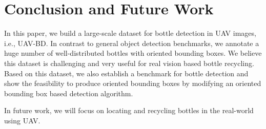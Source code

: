 \section{Conclusion and Future Work}
\label{sec:conclusion}


In this paper, we build a large-scale dataset for bottle detection in UAV images, i.e., UAV-BD. In contrast to general object detection benchmarks, we annotate a huge number of well-distributed bottles with oriented bounding boxes. We believe this dataset is challenging and very useful for real vision based bottle recycling. Based on this dataset, we also establish a benchmark for bottle detection and show the feasibility to produce oriented bounding boxes by modifying an oriented bounding box based detection algorithm.

In future work, we will focus on locating and recycling bottles in the real-world using UAV.